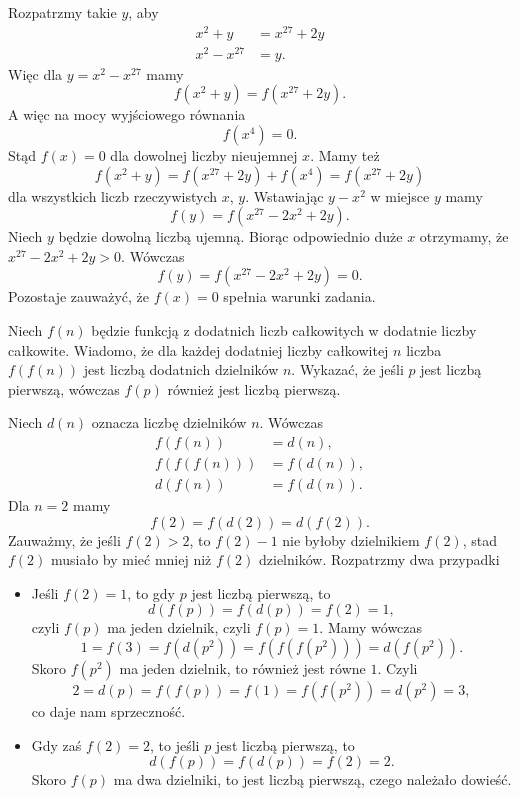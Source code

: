 \noindent
Rozpatrzmy takie $y$, aby 
\begin{align*}
	x^2 + y &= x^{27} + 2y \\
	x^2 - x^{27} &= y.
\end{align*}
Więc dla $y = x^2 - x^{27}$ mamy
\[
	f(x^2 + y) = f(x^{27} + 2y).
\]
A więc na mocy wyjściowego równania
\[
	f(x^4) = 0.
\]
Stąd $f(x) = 0$ dla dowolnej liczby nieujemnej $x$. Mamy też
\[
	f(x^2 + y) = f(x^{27} + 2y) + f(x^4) =  f(x^{27} + 2y)
\]
dla wszystkich liczb rzeczywistych $x$, $y$. Wstawiając $y - x^2$ w miejsce $y$ mamy
\[
	f(y) = f(x^{27} - 2x^2 + 2y).
\]
Niech $y$ będzie dowolną liczbą ujemną. Biorąc odpowiednio duże $x$ otrzymamy, że $x^{27} - 2x^2 + 2y > 0$. Wówczas
\[
	f(y) = f(x^{27} - 2x^2 + 2y) = 0.
\]
Pozostaje zauważyć, że $f(x) = 0$ spełnia warunki zadania.

\begin{problem}{4}
	Niech $f(n)$ będzie funkcją z dodatnich liczb całkowitych w dodatnie liczby całkowite. Wiadomo, że dla każdej dodatniej liczby całkowitej $n$ liczba  $f(f(n))$ jest liczbą dodatnich dzielników $n$. Wykazać, że jeśli $p$ jest liczbą pierwszą, wówczas $f(p)$ również jest liczbą pierwszą.
\end{problem}

\noindent
Niech $d(n)$ oznacza liczbę dzielników $n$. Wówczas
\begin{align*}
	f(f(n)) &= d(n), \\
	f(f(f(n))) &= f(d(n)), \\
	d(f(n)) &= f(d(n)).
\end{align*}
Dla $n = 2$ mamy
\[
	f(2) = f(d(2)) = d(f(2)).
\]
Zauważmy, że jeśli $f(2) > 2$, to $f(2) - 1$ nie byłoby dzielnikiem $f(2)$, stad $f(2)$ musiało by mieć mniej niż $f(2)$ dzielników. Rozpatrzmy dwa przypadki
\begin{itemize}
	\item Jeśli $f(2) = 1$, to gdy $p$ jest liczbą pierwszą, to 
	\[
		d(f(p)) = f(d(p)) = f(2) = 1,
	\]
	czyli $f(p)$ ma jeden dzielnik, czyli $f(p) = 1$. Mamy wówczas
	\[
		1 = f(3) = f(d(p^2)) = f(f(f(p^2))) = d(f(p^2)).
	\]
	Skoro $f(p^2)$ ma jeden dzielnik, to również jest równe $1$. Czyli
	\[
		2 = d(p) = f(f(p)) = f(1) = f(f(p^2)) = d(p^2) = 3,
	\]
	co daje nam sprzeczność.
	\item Gdy zaś $f(2) = 2$, to jeśli $p$ jest liczbą pierwszą, to 
	\[
		d(f(p)) = f(d(p)) = f(2) = 2.
	\]
	Skoro $f(p)$ ma dwa dzielniki, to jest liczbą pierwszą, czego należało dowieść.
\end{itemize}


